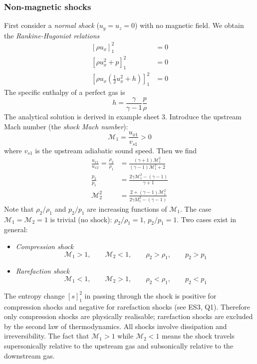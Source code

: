 \documentclass{jknotes}
\newcommand{\dif}[1]{\left[#1\right]_1^2}
\newcommand{\M}{\mathcal{M}}
\begin{document}
\subsubsection{Non-magnetic shocks}
First consider a \emph{normal shock} ($u_y = u_z = 0$) with no magnetic field.
We obtain the \emph{Rankine-Hugoniot relations}
\begin{align}
	\dif{\rho u_x} &= 0\\
	\dif{\rho u_x^2 + p} &= 0\\
	\dif{\rho u_x\left(\frac{1}{2}u_x^2 +h\right)} &= 0
\end{align}
The specific enthalpy of a perfect gas is
\begin{equation}
	h = \frac{\gamma}{\gamma -1}\frac{p}{\rho}
\end{equation}
The analytical solution is derived in example sheet 3. Introduce the upstream
Mach number (the \emph{shock Mach number}):
\begin{equation}
	\M_1 = \frac{u_{x1}}{v_{s1}} > 0
\end{equation}
where $v_{s1}$ is the upstream adiabatic sound speed. Then we find
\begin{align}
	\frac{u_{x1}}{u_{x2}} = \frac{\rho_2}{\rho_1} &=
	\frac{(\gamma+1)\M_1^2}{(\gamma-1)\M_1^2 + 2} \\
	\frac{p_2}{p_1} &= \frac{2\gamma \M_1^2 - (\gamma-1)}{\gamma +1}\\
	\M_2^2 &= \frac{2+(\gamma-1)\M_1^2}{2\gamma M_1^2 - (\gamma -1)}
\end{align}
Note that $\rho_2/\rho_1$ and $p_2/p_1$ are increasing functions of $\M_1$.
The case $\M_1 = \M_2 = 1$ is trivial (no shock): $\rho_2/\rho_1 = 1$,
$p_2/p_1 = 1$. Two cases exist in general:
\begin{itemize}
	\item \emph{Compression shock}
		\begin{equation}
			\M_1 > 1, \hspace{2em} \M_2 < 1, \hspace{2em} \rho_2 > \rho_1,
			\hspace{2em} p_2 > p_1
		\end{equation}
	\item \emph{Rarefaction shock}
		\begin{equation}
			\M_1 < 1, \hspace{2em} \M_2 > 1, \hspace{2em} \rho_2 < \rho_1,
			\hspace{2em} p_2 < p_1
		\end{equation}
\end{itemize}
The entropy change $\dif{s}$ in passing through the shock is positive for
compression shocks and negative for rarefaction shocks (see ES3, Q1).
Therefore only compression shocks are physically realisable; rarefaction
shocks are excluded by the second law of thermodynamics. All shocks involve
dissipation and irreversibility.  The fact that $\M_1 > 1$ while $\M_2 < 1$
means the shock travels supersonically relative to the upstream gas and
subsonically relative to the downstream gas.
\end{document}
